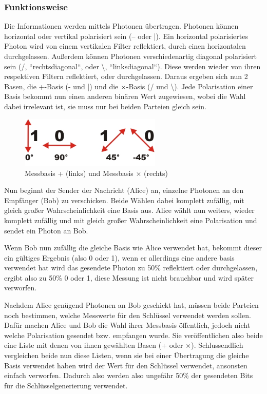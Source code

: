 \subsubsection{Funktionsweise}

Die Informationen werden mittels Photonen übertragen. Photonen können horizontal oder vertikal polarisiert sein (– oder |). Ein horizontal polarisiertes Photon wird von einem vertikalen Filter reflektiert, durch einen horizontalen durchgelassen.
Außerdem können Photonen verschiedenartig diagonal polarisiert sein (/, “rechtsdiagonal“, oder \textbackslash, “linksdiagonal“). Diese werden wieder von ihren respektiven Filtern reflektiert, oder durchgelassen.
Daraus ergeben sich nun 2 Basen, die +-Basis (- und |) und die $\times$-Basis (/ und \textbackslash).
Jede Polarisation einer Basis bekommt nun einen anderen binären Wert zugewiesen, wobei die Wahl dabei irrelevant ist, sie muss nur bei beiden Parteien gleich sein. 

\begin{figure}[!htb]
	\centering\includegraphics[width=0.6\textwidth]{images/polarisation}
	\caption{Messbasis + (links) und Messbasis $\times$ (rechts) \cite{quantenschluesselaustausch}}
	\label{fig:polarisation}
\end{figure}

Nun beginnt der Sender der Nachricht (Alice) an, einzelne Photonen an den Empfänger (Bob) zu verschicken. Beide Wählen dabei komplett zufällig, mit gleich großer Wahrscheinlichkeit eine Basis aus. 
Alice wählt nun weiters, wieder komplett zufällig und mit gleich großer Wahrscheinlichkeit eine Polarisation und sendet ein Photon an Bob.

Wenn Bob nun zufällig die gleiche Basis wie Alice verwendet hat, bekommt dieser ein gültiges Ergebnis (also 0 oder 1), wenn er allerdings eine andere basis verwendet hat wird das gesendete Photon zu 50\% reflektiert oder durchgelassen, ergibt also zu 50\% 0 oder 1, diese Messung ist nicht brauchbar und wird später verworfen.

Nachdem Alice genügend Photonen an Bob geschickt hat, müssen beide Parteien noch bestimmen, welche Messwerte für den Schlüssel verwendet werden sollen.
Dafür machen Alice und Bob die Wahl ihrer Messbasis öffentlich, jedoch nicht welche Polarisation gesendet bzw. empfangen wurde. Sie veröffentlichen also beide eine Liste mit denen von ihnen gewählten Basen (+ oder $\times$).
Schlussendlich vergleichen beide nun diese Listen, wenn sie bei einer Übertragung die gleiche Basis verwendet haben wird der Wert für den Schlüssel verwendet, ansonsten einfach verworfen.
Dadurch also werden also ungefähr 50\% der gesendeten Bits für die Schlüsselgenerierung verwendet.

